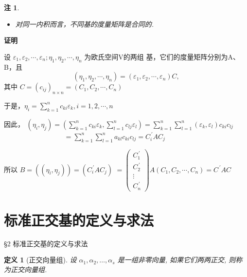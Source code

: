 \documentclass[13pt]{beamer}
\newtheorem*{defi}{定义}
\newtheorem*{rem}{注}
\def\pf{{\bf 证明~~ }}
\begin{document}
\begin{frame}

\begin{rem}
	\begin{itemize}
	\item 对同一内积而言，不同基的度量矩阵是合同的. 
	\end{itemize}
\end{rem}
\pf
\small{ 设 $\varepsilon_{1}, \varepsilon_{2}, \cdots, \varepsilon_{n} ; \eta_{1}, \eta_{2}, \cdots, \eta_{n}$ 为欧氏空间V的两组
基，它们的度量矩阵分别为A、B，且
$$\left(\eta_{1}, \eta_{2}, \cdots, \eta_{n}\right)=\left(\varepsilon_{1}, \varepsilon_{2}, \cdots, \varepsilon_{n}\right) C,$$
其中 $C=\left(c_{i j}\right)_{n \times n}=\left(C_{1}, C_{2}, \cdots, C_{n}\right)$

于是，$\eta_{i}=\sum_{k=1}^{n} c_{k i} \varepsilon_{k}, i=1,2, \cdots, n$

因此， 
$\left(\eta_{i}, \eta_{j}\right) =\left(\sum_{k=1}^{n} c_{k i} \varepsilon_{k}, \sum_{l=1}^{n} c_{l j} \varepsilon_{l}\right)=\sum_{k=1}^{n} \sum_{l=1}^{n}\left(\varepsilon_{k}, \varepsilon_{l}\right) c_{k i} c_{l j}$\\
	~~~~~~~~~~~~~~~~~
	$ =\sum_{k=1}^{n} \sum_{l=1}^{n} a_{k l} c_{k i} c_{l j}=C_{i}^{\, \prime} A C_{j}$

所以 $B=\left(\left(\eta_{i}, \eta_{j}\right)\right)=\left(C_{i}^{\, \prime} A C_{j}\right)$
$=\left(\begin{array}{c}C_{1}^{\, \prime} \\ C_{2}^{\, \prime} \\ \vdots \\ C_{n}^{\, \prime}\end{array}\right) A\left(C_{1}, C_{2}, \cdots, C_{n}\right)=C^{\, \prime} A C$
}
\end{frame}

\section{标准正交基的定义与求法}
\begin{frame}{\S 2 标准正交基的定义与求法}

\begin{defi}[正交向量组]
设 $\alpha_{1}, \alpha_{2}, \ldots, \alpha_{s}$ 是一组非零向量, 如果它们两两正交, 则称为\alert{正交向量组}.
\end{defi}
\end{frame}
\end{document}
